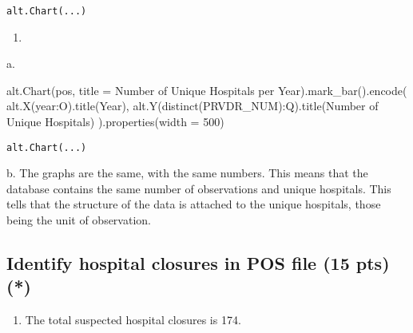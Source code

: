 \documentclass[
  letterpaper,
  DIV=11,
  numbers=noendperiod]{scrartcl}
\newenvironment{Shaded}{\begin{snugshade}}{\end{snugshade}}
\newcommand{\DecValTok}[1]{\textcolor[rgb]{0.68,0.00,0.00}{#1}}
\newcommand{\NormalTok}[1]{\textcolor[rgb]{0.00,0.23,0.31}{#1}}
\newcommand{\OperatorTok}[1]{\textcolor[rgb]{0.37,0.37,0.37}{#1}}
\newcommand{\StringTok}[1]{\textcolor[rgb]{0.13,0.47,0.30}{#1}}
\providecommand{\tightlist}{%
  \setlength{\itemsep}{0pt}\setlength{\parskip}{0pt}}\usepackage{longtable,booktabs,array}
\begin{document}
\begin{verbatim}
alt.Chart(...)
\end{verbatim}

\begin{enumerate}
\def\labelenumi{\arabic{enumi}.}
\setcounter{enumi}{3}
\tightlist
\item
\end{enumerate}

\hfill\break
a.

\begin{Shaded}
\begin{Highlighting}[]
\NormalTok{alt.Chart(pos, title }\OperatorTok{=} \StringTok{\textquotesingle{}Number of Unique Hospitals per Year\textquotesingle{}}\NormalTok{).mark\_bar().encode(}
\NormalTok{  alt.X(}\StringTok{\textquotesingle{}year:O\textquotesingle{}}\NormalTok{).title(}\StringTok{\textquotesingle{}Year\textquotesingle{}}\NormalTok{),}
\NormalTok{  alt.Y(}\StringTok{\textquotesingle{}distinct(PRVDR\_NUM):Q\textquotesingle{}}\NormalTok{).title(}\StringTok{\textquotesingle{}Number of Unique Hospitals\textquotesingle{}}\NormalTok{)}
\NormalTok{).properties(width }\OperatorTok{=} \DecValTok{500}\NormalTok{)}
\end{Highlighting}
\end{Shaded}

\begin{verbatim}
alt.Chart(...)
\end{verbatim}

\hfill\break
b. The graphs are the same, with the same numbers. This means that the
database contains the same number of observations and unique hospitals.
This tells that the structure of the data is attached to the unique
hospitals, those being the unit of observation.

\subsection{Identify hospital closures in POS file (15 pts)
(*)}\label{identify-hospital-closures-in-pos-file-15-pts}

\begin{enumerate}
\def\labelenumi{\arabic{enumi}.}
\tightlist
\item
  The total suspected hospital closures is 174.
\end{enumerate}
\end{document}
